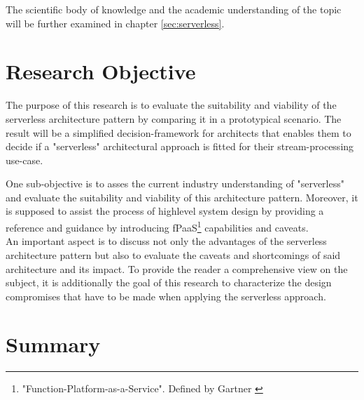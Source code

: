The scientific body of knowledge and the academic understanding of the topic will be further examined in chapter \ref{sec:serverless}.

\section{Research Objective}


The purpose of this research is to evaluate the suitability and viability of the serverless architecture pattern by comparing it in a prototypical scenario. The result will be a simplified decision-framework for architects that enables them to decide if a "serverless" architectural approach is fitted for their stream-processing use-case.

One sub-objective is to asses the current industry understanding of "serverless" and evaluate the suitability and viability of this architecture pattern.
Moreover, it is supposed to assist the process of highlevel system design by providing a reference and guidance by introducing fPaaS\footnote{"Function-Platform-as-a-Service". Defined by Gartner \autocite{Chandrasekaran2017EvolutionWhen}} capabilities and caveats.\\
An important aspect is to discuss not only the advantages of the serverless architecture pattern but also to evaluate the caveats and shortcomings of said architecture and its impact. To provide the reader a comprehensive view on the subject, it is additionally the goal of this research to characterize the design compromises that have to be made when applying the serverless approach.  

\section{Summary}
